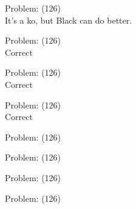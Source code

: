 \documentclass[11pt]{article}
\begin{document}
\begin{minipage}[t]{0.5\textwidth}
  {\centering
  
  Problem: (126)\\
  It's a ko, but Black can do better.\\
  }
\end{minipage}
\begin{minipage}[t]{0.5\textwidth}
  {\centering
  
  Problem: (126)\\
  Correct\\
  }
\end{minipage}
\begin{minipage}[t]{0.5\textwidth}
  {\centering
  
  Problem: (126)\\
  Correct\\
  }
\end{minipage}
\begin{minipage}[t]{0.5\textwidth}
  {\centering
  
  Problem: (126)\\
  Correct\\
  }
\end{minipage}
\begin{minipage}[t]{0.5\textwidth}
  {\centering
  
  Problem: (126)\\
  
  }
\end{minipage}
\begin{minipage}[t]{0.5\textwidth}
  {\centering
  
  Problem: (126)\\
  
  }
\end{minipage}
\begin{minipage}[t]{0.5\textwidth}
  {\centering
  
  Problem: (126)\\
  
  }
\end{minipage}
\begin{minipage}[t]{0.5\textwidth}
  {\centering
  
  Problem: (126)\\
  
  }
\end{minipage}
\end{document}
